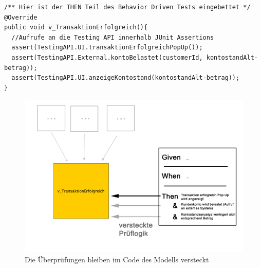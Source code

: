 \begin{lstlisting}[caption=Überprüfungen mittels Testing API in Blattknoten, label=lst:mbt_bdt_assertion]
/** Hier ist der THEN Teil des Behavior Driven Tests eingebettet */
@Override
public void v_TransaktionErfolgreich(){
  //Aufrufe an die Testing API innerhalb JUnit Assertions
  assert(TestingAPI.UI.transaktionErfolgreichPopUp());
  assert(TestingAPI.External.kontoBelastet(customerId, kontostandAlt-betrag));
  assert(TestingAPI.UI.anzeigeKontostand(kontostandAlt-betrag));
}
\end{lstlisting}


\begin{figure} 
  \centering
     \includegraphics[width=1\textwidth]{figures/mbt_bdt_then.png}
  \caption{Die Überprüfungen bleiben im Code des Modells versteckt}
  \label{fig:mbt_bdt_then}
\end{figure}

